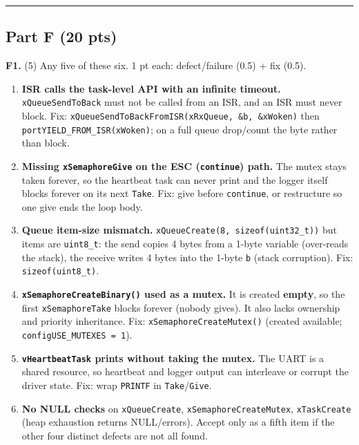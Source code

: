 \documentclass[
  11pt,
]{article}
\providecommand{\tightlist}{%
  \setlength{\itemsep}{0pt}\setlength{\parskip}{0pt}}
\begin{document}
\begin{center}\rule{0.5\linewidth}{0.5pt}\end{center}

\subsection{Part F (20 pts)}\label{part-f-20-pts}

\textbf{F1.} (5) Any five of these six. 1 pt each: defect/failure (0.5)
+ fix (0.5).

\begin{enumerate}
\def\labelenumi{\arabic{enumi}.}
\tightlist
\item
  \textbf{ISR calls the task-level API with an infinite timeout.}
  \texttt{xQueueSendToBack} must not be called from an ISR, and an ISR
  must never block. Fix:
  \texttt{xQueueSendToBackFromISR(xRxQueue,\ \&b,\ \&xWoken)} then
  \texttt{portYIELD\_FROM\_ISR(xWoken)}; on a full queue drop/count the
  byte rather than block.
\item
  \textbf{Missing \texttt{xSemaphoreGive} on the ESC (\texttt{continue})
  path.} The mutex stays taken forever, so the heartbeat task can never
  print and the logger itself blocks forever on its next \texttt{Take}.
  Fix: give before \texttt{continue}, or restructure so one give ends
  the loop body.
\item
  \textbf{Queue item-size mismatch.}
  \texttt{xQueueCreate(8,\ sizeof(uint32\_t))} but items are
  \texttt{uint8\_t}: the send copies 4 bytes from a 1-byte variable
  (over-reads the stack), the receive writes 4 bytes into the 1-byte
  \texttt{b} (stack corruption). Fix: \texttt{sizeof(uint8\_t)}.
\item
  \textbf{\texttt{xSemaphoreCreateBinary()} used as a mutex.} It is
  created \textbf{empty}, so the first \texttt{xSemaphoreTake} blocks
  forever (nobody gives). It also lacks ownership and priority
  inheritance. Fix: \texttt{xSemaphoreCreateMutex()} (created available;
  \texttt{configUSE\_MUTEXES\ =\ 1}).
\item
  \textbf{\texttt{vHeartbeatTask} prints without taking the mutex.} The
  UART is a shared resource, so heartbeat and logger output can
  interleave or corrupt the driver state. Fix: wrap \texttt{PRINTF} in
  \texttt{Take}/\texttt{Give}.
\item
  \textbf{No NULL checks} on \texttt{xQueueCreate},
  \texttt{xSemaphoreCreateMutex}, \texttt{xTaskCreate} (heap exhaustion
  returns NULL/errors). Accept only as a fifth item if the other four
  distinct defects are not all found.
\end{enumerate}
\end{document}
